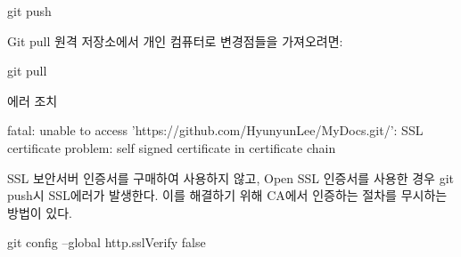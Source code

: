 git push

Git pull
원격 저장소에서 개인 컴퓨터로 변경점들을 가져오려면:

git pull





에러 조치

fatal: unable to access 'https://github.com/HyunyunLee/MyDocs.git/': SSL certificate problem: self signed certificate in certificate chain

SSL 보안서버 인증서를 구매하여 사용하지 않고, Open SSL 인증서를 사용한 경우 git push시 SSL에러가 발생한다.
이를 해결하기 위해 CA에서 인증하는 절차를 무시하는 방법이 있다.

git config --global http.sslVerify false